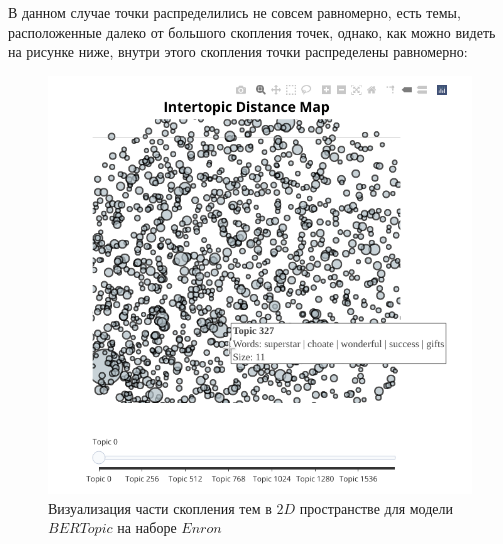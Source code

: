 В данном случае точки распределились не совсем равномерно, есть темы, расположенные далеко от
большого скопления точек, однако, как можно видеть на рисунке ниже, внутри этого скопления точки распределены равномерно: 

\begin{figure}[H]
\centering
\includegraphics[scale=0.9]{pics/bert-circle.png}
\caption{Визуализация части скопления тем в $2D$ пространстве для модели $BERTopic$ на наборе $Enron$}
\end{figure}
